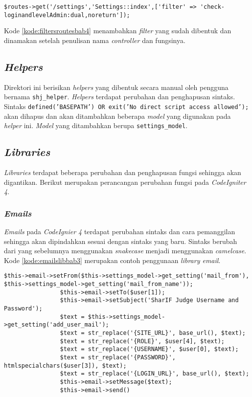 \begin{lstlisting}[caption=Penambahan \textit{filter} pada \textit{routes}, label=kode:filtersroutesbab4]
	$routes->get('/settings','Settings::index',['filter' => 'check-loginandlevelAdmin:dual,noreturn']);
\end{lstlisting}

Kode \ref{kode:filtersroutesbab4} menambahkan \textit{filter} yang sudah dibentuk dan dinamakan setelah penulisan nama \textit{controller} dan fungsinya. 

\subsection{\textit{Helpers}}
Direktori ini berisikan \textit{helpers} yang dibentuk secara manual oleh pengguna bernama \texttt{shj\_helper}. \textit{Helpers} terdapat perubahan dan penghapusan sintaks. Sintaks \texttt{defined('BASEPATH') OR exit('No direct script access allowed');} akan dihapus dan akan ditambahkan beberapa \textit{model} yang digunakan pada \textit{helper} ini. \textit{Model} yang ditambahkan berupa \texttt{settings\_model}.

\subsection{\textit{Libraries}}
\textit{Libraries} terdapat beberapa perubahan dan penghapusan fungsi sehingga akan digantikan. Berikut merupakan perancangan perubahan fungsi pada \textit{CodeIgniter 4}.

\subsubsection{\textit{Emails}}
\textit{Emails} pada \textit{CodeIgnier 4} terdapat perubahan sintaks dan cara pemanggilan sehingga akan dipindahkan sesuai dengan sintaks yang baru. Sintaks berubah dari yang sebelumnya menggunakan \textit{snakecase} menjadi menggunakan \textit{camelcase}. Kode \ref{kode:emailslibbab3} merupakan contoh penggunaan \textit{library email}.

\begin{lstlisting}[caption=Perubahan penggunaan sintaks pada \textit{library emails}, label=kode:emailslibbab3]
$this->email->setFrom($this->settings_model->get_setting('mail_from'), $this->settings_model->get_setting('mail_from_name'));
				$this->email->setTo($user[1]);
				$this->email->setSubject('SharIF Judge Username and Password');
				$text = $this->settings_model->get_setting('add_user_mail');
				$text = str_replace('{SITE_URL}', base_url(), $text);
				$text = str_replace('{ROLE}', $user[4], $text);
				$text = str_replace('{USERNAME}', $user[0], $text);
				$text = str_replace('{PASSWORD}', htmlspecialchars($user[3]), $text);
				$text = str_replace('{LOGIN_URL}', base_url(), $text);
				$this->email->setMessage($text);
				$this->email->send()
\end{lstlisting}

